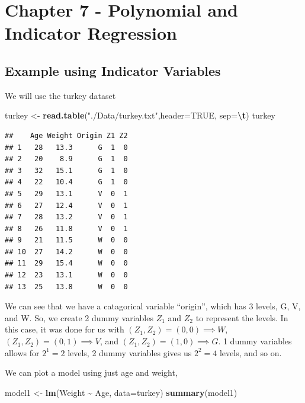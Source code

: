 \documentclass[
  11pt,
]{article}
\newenvironment{Shaded}{\begin{snugshade}}{\end{snugshade}}
\newcommand{\AttributeTok}[1]{\textcolor[rgb]{0.13,0.29,0.53}{#1}}
\newcommand{\ConstantTok}[1]{\textcolor[rgb]{0.56,0.35,0.01}{#1}}
\newcommand{\FunctionTok}[1]{\textcolor[rgb]{0.13,0.29,0.53}{\textbf{#1}}}
\newcommand{\NormalTok}[1]{#1}
\newcommand{\OtherTok}[1]{\textcolor[rgb]{0.56,0.35,0.01}{#1}}
\newcommand{\SpecialCharTok}[1]{\textcolor[rgb]{0.81,0.36,0.00}{\textbf{#1}}}
\newcommand{\StringTok}[1]{\textcolor[rgb]{0.31,0.60,0.02}{#1}}
\begin{document}
\section{Chapter 7 - Polynomial and Indicator
Regression}\label{chapter-7---polynomial-and-indicator-regression}

\subsection{Example using Indicator
Variables}\label{example-using-indicator-variables}

We will use the turkey dataset

\begin{Shaded}
\begin{Highlighting}[]
\NormalTok{turkey }\OtherTok{\textless{}{-}} \FunctionTok{read.table}\NormalTok{(}\StringTok{"./Data/turkey.txt"}\NormalTok{,}\AttributeTok{header=}\ConstantTok{TRUE}\NormalTok{, }\AttributeTok{sep=}\StringTok{\textquotesingle{}}\SpecialCharTok{\textbackslash{}t}\StringTok{\textquotesingle{}}\NormalTok{)}
\NormalTok{turkey}
\end{Highlighting}
\end{Shaded}

\begin{verbatim}
##    Age Weight Origin Z1 Z2
## 1   28   13.3      G  1  0
## 2   20    8.9      G  1  0
## 3   32   15.1      G  1  0
## 4   22   10.4      G  1  0
## 5   29   13.1      V  0  1
## 6   27   12.4      V  0  1
## 7   28   13.2      V  0  1
## 8   26   11.8      V  0  1
## 9   21   11.5      W  0  0
## 10  27   14.2      W  0  0
## 11  29   15.4      W  0  0
## 12  23   13.1      W  0  0
## 13  25   13.8      W  0  0
\end{verbatim}

We can see that we have a catagorical variable ``origin'', which has 3
levels, G, V, and W. So, we create 2 dummy variables \(Z_1\) and \(Z_2\)
to represent the levels. In this case, it was done for us with
\((Z_1, Z_2) = (0,0) \implies W\), \((Z_1, Z_2) = (0,1) \implies V\),
and \((Z_1, Z_2) = (1,0) \implies G\). 1 dummy variables allows for
\(2^1 = 2\) levels, 2 dummy variables gives us \(2^{2} = 4\) levels, and
so on.

We can plot a model using just age and weight,

\begin{Shaded}
\begin{Highlighting}[]
\NormalTok{model1 }\OtherTok{\textless{}{-}} \FunctionTok{lm}\NormalTok{(Weight }\SpecialCharTok{\textasciitilde{}}\NormalTok{ Age, }\AttributeTok{data=}\NormalTok{turkey)}
\FunctionTok{summary}\NormalTok{(model1) }
\end{Highlighting}
\end{Shaded}
\end{document}

